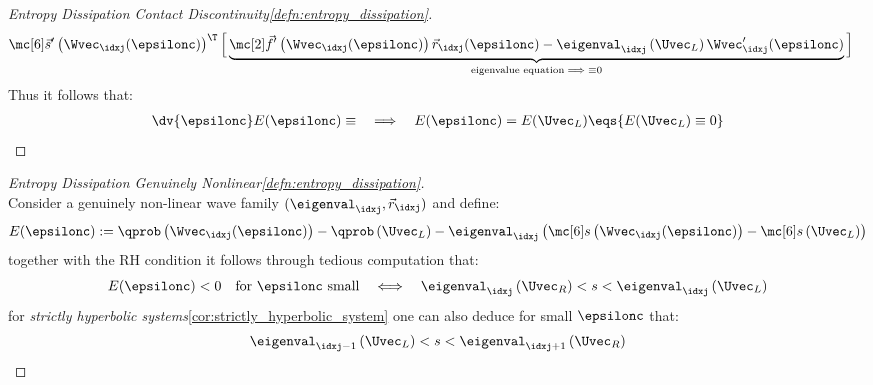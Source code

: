 \begin{proofbox}
\begin{proof}[\newline Entropy Dissipation Contact Discontinuity\cref{defn:entropy_dissipation}]
\begin{align*}
        &\entropyvec'\left(\Wvec_{\idxj}(\epsilonc)\right)^{\T}
            \Big[\underbrace{\fluxvec'\left(\Wvec_{\idxj}(\epsilonc)\right)\vec{r}_{\idxj}(\epsilonc)
             -\eigenval_{\idxj}\left(\Uvec_{L}\right)\Wvec_{\idxj}'(\epsilonc)}_{\text{eigenvalue equation}\implies\equiv0}\Big]
        \end{align*}
        Thus it follows that:
        \begin{align}
          \dv{\epsilonc}E(\epsilonc)\equiv&&\implies&&E(\epsilonc)=E(\Uvec_{L})\eqs{E(\Uvec_{L})\equiv0}
        \end{align}
    \end{proof}
\end{proofbox}
\begin{proofbox}\nospacing
    \begin{proof}[\newline Entropy Dissipation Genuinely Nonlinear\cref{defn:entropy_dissipation}]\label{proof:defn:entropy_dissipation_gnl}\leavevmode\\
        Consider a genuinely non-linear wave family $(\eigenval_{\idxj},\vec{r}_{\idxj})$ and define:
        \begin{align*}
          E(\epsilonc):=\qprob \left(\Wvec_{\idxj}(\epsilonc)\right)-\qprob \left(\Uvec_{L}\right)-\eigenval_{\idxj}\left(\entropy\left(\Wvec_{\idxj}(\epsilonc)\right)-\entropy\left(\Uvec_{L}\right)\right)
        \end{align*}
        together with the RH condition it follows through tedious computation that:
        \begin{align*}
          E(\epsilonc)<0&&\text{for $\epsilonc$ small}&&\iff&&\eigenval_{\idxj}\left(\Uvec_{R}\right)<s<\eigenval_{\idxj}\left(\Uvec_{L}\right)
        \end{align*}
        for \textit{strictly hyperbolic systems}\cref{cor:strictly_hyperbolic_system} one can also deduce for small $\epsilonc$ that:
        \begin{align}
          \eigenval_{\idxj-1}\left(\Uvec_{L}\right)<s<\eigenval_{\idxj+1}\left(\Uvec_{R}\right)
        \end{align}
    \end{proof}
\end{proofbox}
